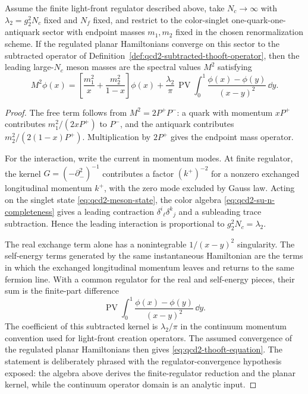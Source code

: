 \begin{theorem}
\label{thm:qcd2-planar-thooft-equation}
Assume the finite light-front regulator described above, take
\(N_c\to\infty\) with \(\lambda_2=g_2^2N_c\) fixed and \(N_f\) fixed, and
restrict to the color-singlet one-quark-one-antiquark sector with endpoint
masses \(m_1,m_2\) fixed in the chosen renormalization scheme.  If the
regulated planar Hamiltonians converge on this sector to the subtracted
operator of Definition~\ref{def:qcd2-subtracted-thooft-operator}, then the
leading large-\(N_c\) meson masses are the spectral values \(M^2\) satisfying
\begin{equation}
  M^2\phi(x)
  =
  \left[
    \frac{m_1^2}{x}
    +
    \frac{m_2^2}{1-x}
  \right]\phi(x)
  +
  \frac{\lambda_2}{\pi}\,
  \operatorname{PV}\int_0^1
  \frac{\phi(x)-\phi(y)}{(x-y)^2}\,\dd y .
  \label{eq:qcd2-thooft-equation}
\end{equation}
\end{theorem}

\begin{proof}
The free term follows from \(M^2=2P^+P^-\): a quark with momentum \(xP^+\)
contributes \(m_1^2/(2xP^+)\) to \(P^-\), and the antiquark contributes
\(m_2^2/(2(1-x)P^+)\).  Multiplication by \(2P^+\) gives the endpoint mass
operator.

For the interaction, write the current in momentum modes.  At finite
regulator, the kernel \(G=(-\partial_-^2)^{-1}\) contributes a factor
\((k^+)^{-2}\) for a nonzero exchanged longitudinal momentum \(k^+\), with
the zero mode excluded by Gauss law.  Acting on the singlet state
\eqref{eq:qcd2-meson-state}, the color algebra
\eqref{eq:qcd2-su-n-completeness} gives a leading contraction
\(\delta^i{}_\ell\delta^k{}_j\) and a subleading trace subtraction.  Hence the
leading interaction is proportional to \(g_2^2N_c=\lambda_2\).

The real exchange term alone has a nonintegrable \(1/(x-y)^2\) singularity.
The self-energy terms generated by the same instantaneous Hamiltonian are the
terms in which the exchanged longitudinal momentum leaves and returns to the
same fermion line.  With a common regulator for the real and self-energy
pieces, their sum is the finite-part difference
\[
  \operatorname{PV}\int_0^1
  \frac{\phi(x)-\phi(y)}{(x-y)^2}\,\dd y .
\]
The coefficient of this subtracted kernel is \(\lambda_2/\pi\) in the
continuum momentum convention used for light-front creation operators.  The
assumed convergence of the regulated planar Hamiltonians then gives
\eqref{eq:qcd2-thooft-equation}.  The statement is deliberately phrased with
the regulator-convergence hypothesis exposed: the algebra above derives the
finite-regulator reduction and the planar kernel, while the continuum
operator domain is an analytic input.
\end{proof}

